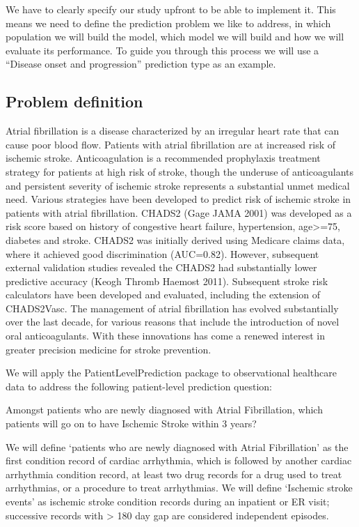 \documentclass[]{article}
\begin{document}
We have to clearly specify our study upfront to be able to implement it.
This means we need to define the prediction problem we like to address,
in which population we will build the model, which model we will build
and how we will evaluate its performance. To guide you through this
process we will use a ``Disease onset and progression'' prediction type
as an example.

\subsection{Problem definition}\label{problem-definition}

Atrial fibrillation is a disease characterized by an irregular heart
rate that can cause poor blood flow. Patients with atrial fibrillation
are at increased risk of ischemic stroke. Anticoagulation is a
recommended prophylaxis treatment strategy for patients at high risk of
stroke, though the underuse of anticoagulants and persistent severity of
ischemic stroke represents a substantial unmet medical need. Various
strategies have been developed to predict risk of ischemic stroke in
patients with atrial fibrillation. CHADS2 (Gage JAMA 2001) was developed
as a risk score based on history of congestive heart failure,
hypertension, age\textgreater{}=75, diabetes and stroke. CHADS2 was
initially derived using Medicare claims data, where it achieved good
discrimination (AUC=0.82). However, subsequent external validation
studies revealed the CHADS2 had substantially lower predictive accuracy
(Keogh Thromb Haemost 2011). Subsequent stroke risk calculators have
been developed and evaluated, including the extension of CHADS2Vasc. The
management of atrial fibrillation has evolved substantially over the
last decade, for various reasons that include the introduction of novel
oral anticoagulants. With these innovations has come a renewed interest
in greater precision medicine for stroke prevention.

We will apply the PatientLevelPrediction package to observational
healthcare data to address the following patient-level prediction
question:

Amongst patients who are newly diagnosed with Atrial Fibrillation, which
patients will go on to have Ischemic Stroke within 3 years?

We will define `patients who are newly diagnosed with Atrial
Fibrillation' as the first condition record of cardiac arrhythmia, which
is followed by another cardiac arrhythmia condition record, at least two
drug records for a drug used to treat arrhythmias, or a procedure to
treat arrhythmias. We will define `Ischemic stroke events' as ischemic
stroke condition records during an inpatient or ER visit; successive
records with \textgreater{} 180 day gap are considered independent
episodes.
\end{document}
